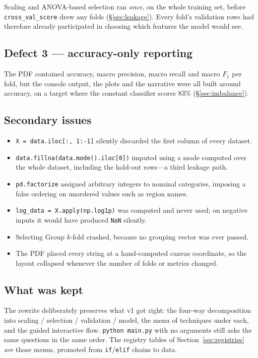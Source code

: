 \documentclass[11pt,a4paper]{article}
\begin{document}
Scaling and ANOVA-based selection ran \emph{once}, on the whole training set,
before \texttt{cross\_val\_score} drew any folds (\S\ref{sec:leakage}). Every
fold's validation rows had therefore already participated in choosing which
features the model would see.

\subsection{Defect 3 --- accuracy-only reporting}

The PDF contained accuracy, macro precision, macro recall and macro $F_1$ per
fold, but the console output, the plots and the narrative were all built around
accuracy, on a target where the constant classifier scores $83\%$
(\S\ref{sec:imbalance}).

\subsection{Secondary issues}

\begin{itemize}[leftmargin=1.4em,itemsep=0.25em]
  \item \texttt{X = data.iloc[:, 1:-1]} silently discarded the first column of every dataset.
  \item \texttt{data.fillna(data.mode().iloc[0])} imputed using a mode computed over the whole dataset, including the hold-out rows---a third leakage path.
  \item \texttt{pd.factorize} assigned arbitrary integers to nominal categories, imposing a false ordering on unordered values such as region names.
  \item \texttt{log\_data = X.apply(np.log1p)} was computed and never used; on negative inputs it would have produced \texttt{NaN} silently.
  \item Selecting Group $k$-fold crashed, because no grouping vector was ever passed.
  \item The PDF placed every string at a hand-computed canvas coordinate, so the layout collapsed whenever the number of folds or metrics changed.
\end{itemize}

\subsection{What was kept}

The rewrite deliberately preserves what v1 got right: the four-way
decomposition into scaling / selection / validation / model, the menu of
techniques under each, and the guided interactive flow. \texttt{python main.py}
with no arguments still asks the same questions in the same order. The registry
tables of Section~\ref{sec:registries} \emph{are} those menus, promoted from
\texttt{if}/\texttt{elif} chains to data.
\end{document}
